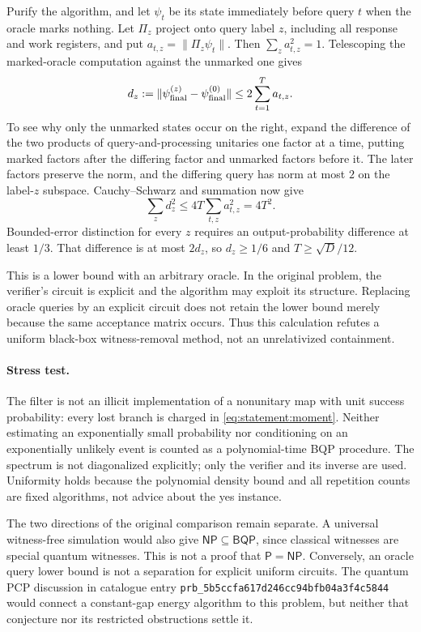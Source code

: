 \documentclass[11pt,a4paper]{article}
\numberwithin{equation}{section}
\begin{document}
Purify the algorithm, and let $\psi_t$ be its state immediately before
query $t$ when the oracle marks nothing. Let $\Pi_z$ project onto query
label $z$, including all response and work registers, and put
$a_{t,z}=\|\Pi_z\psi_t\|$. Then $\sum_z a_{t,z}^2=1$.
Telescoping the marked-oracle computation against the unmarked one gives
\[
 d_z:=\|\psi^{(z)}_{\rm final}-\psi^{(0)}_{\rm final}\|
       \le 2\sum_{t=1}^T a_{t,z}.
\]
To see why only the unmarked states occur on the right, expand the
difference of the two products of query-and-processing unitaries one factor
at a time, putting marked factors after the differing factor and unmarked
factors before it. The later factors preserve the norm, and the differing
query has norm at most $2$ on the label-$z$ subspace.
Cauchy--Schwarz and summation now give
\[
 \sum_z d_z^2\le4T\sum_{t,z}a_{t,z}^2=4T^2.
\]
Bounded-error distinction for every $z$ requires an output-probability
difference at least $1/3$. That difference is at most $2d_z$, so
$d_z\ge1/6$ and $T\ge\sqrt D/12$.

This is a lower bound with an arbitrary oracle. In the original problem,
the verifier's circuit is explicit and the algorithm may exploit its
structure. Replacing oracle queries by an explicit circuit does not retain
the lower bound merely because the same acceptance matrix occurs. Thus this
calculation refutes a uniform black-box witness-removal method, not an
unrelativized containment.

\paragraph{Stress test.}
The filter is not an illicit implementation of a nonunitary map with unit
success probability: every lost branch is charged in
\eqref{eq:statement:moment}. Neither estimating an exponentially small probability
nor conditioning on an exponentially unlikely event is counted as a
polynomial-time BQP procedure. The spectrum is not diagonalized explicitly;
only the verifier and its inverse are used. Uniformity holds because the
polynomial density bound and all repetition counts are fixed algorithms,
not advice about the yes instance.

The two directions of the original comparison remain separate. A universal
witness-free simulation would also give $\mathsf{NP}\subseteq\mathsf{BQP}$,
since classical witnesses are special quantum witnesses. This is not a proof
that $\mathsf P=\mathsf{NP}$. Conversely, an oracle query lower bound is
not a separation for explicit uniform circuits. The quantum PCP discussion
in catalogue entry \texttt{prb\_5b5ccfa617d246cc94bfb04a3f4c5844} would connect a constant-gap energy algorithm to this problem,
but neither that conjecture nor its restricted obstructions settle it.
\end{document}

